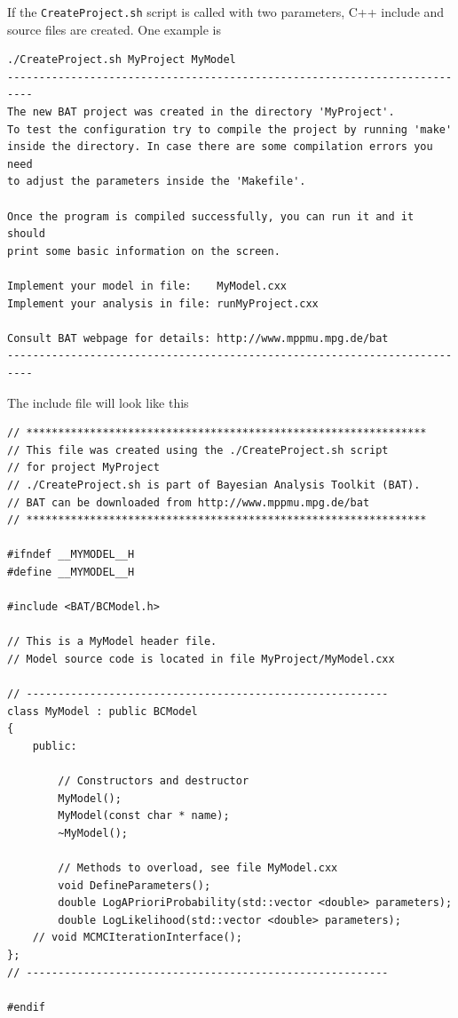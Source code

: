 \documentclass[11pt, a4paper]{article}
\begin{document}
\noindent
If the \verb|CreateProject.sh| script is called with two parameters,
C++ include and source files are created. One example is

\begin{verbatim}
./CreateProject.sh MyProject MyModel
--------------------------------------------------------------------------
The new BAT project was created in the directory 'MyProject'.
To test the configuration try to compile the project by running 'make'
inside the directory. In case there are some compilation errors you need
to adjust the parameters inside the 'Makefile'.

Once the program is compiled successfully, you can run it and it should
print some basic information on the screen.

Implement your model in file:    MyModel.cxx
Implement your analysis in file: runMyProject.cxx

Consult BAT webpage for details: http://www.mppmu.mpg.de/bat
--------------------------------------------------------------------------
\end{verbatim}

\noindent
The include file will look like this

\begin{verbatim}
// ***************************************************************
// This file was created using the ./CreateProject.sh script
// for project MyProject
// ./CreateProject.sh is part of Bayesian Analysis Toolkit (BAT).
// BAT can be downloaded from http://www.mppmu.mpg.de/bat
// ***************************************************************

#ifndef __MYMODEL__H
#define __MYMODEL__H

#include <BAT/BCModel.h>

// This is a MyModel header file.
// Model source code is located in file MyProject/MyModel.cxx

// ---------------------------------------------------------
class MyModel : public BCModel
{
	public:

		// Constructors and destructor
		MyModel();
		MyModel(const char * name);
		~MyModel();

		// Methods to overload, see file MyModel.cxx
		void DefineParameters();
		double LogAPrioriProbability(std::vector <double> parameters);
		double LogLikelihood(std::vector <double> parameters);
    // void MCMCIterationInterface(); 
};
// ---------------------------------------------------------

#endif
\end{verbatim}
\end{document}
